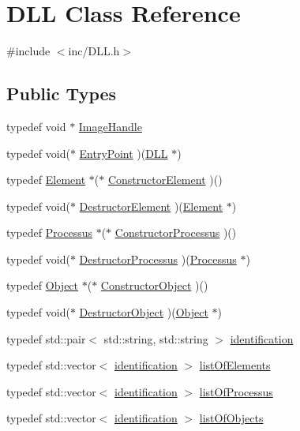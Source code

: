 \hypertarget{classDLL}{
\section{DLL Class Reference}
\label{classDLL}
}


{\ttfamily \#include $<$inc/DLL.h$>$}\subsection*{Public Types}
\begin{DoxyCompactItemize}
\item 
typedef void $\ast$ \hyperlink{classDLL_addaefe5c907a5f357cc18718300f22b0}{ImageHandle}
\item 
typedef void($\ast$ \hyperlink{classDLL_a9b8086a1063fe93f3545a3d20c5ca192}{EntryPoint} )(\hyperlink{classDLL}{DLL} $\ast$)
\item 
typedef \hyperlink{classElement}{Element} $\ast$($\ast$ \hyperlink{classDLL_a7b46644880e5b843144baed79bb2f961}{ConstructorElement} )()
\item 
typedef void($\ast$ \hyperlink{classDLL_a6e838cc12677c8ea48d5312984f8f18b}{DestructorElement} )(\hyperlink{classElement}{Element} $\ast$)
\item 
typedef \hyperlink{classProcessus}{Processus} $\ast$($\ast$ \hyperlink{classDLL_ad47776a706e85c9bdae28ec91e88b8e8}{ConstructorProcessus} )()
\item 
typedef void($\ast$ \hyperlink{classDLL_a3bd20fb58c02a1a2f4e96d59da21faf5}{DestructorProcessus} )(\hyperlink{classProcessus}{Processus} $\ast$)
\item 
typedef \hyperlink{classObject}{Object} $\ast$($\ast$ \hyperlink{classDLL_a19c89e48f530542f639456f569ede17a}{ConstructorObject} )()
\item 
typedef void($\ast$ \hyperlink{classDLL_a143a49a77c9a75b043e9dba700afc45b}{DestructorObject} )(\hyperlink{classObject}{Object} $\ast$)
\item 
typedef std::pair$<$ std::string, std::string $>$ \hyperlink{classDLL_aa2df9e9226052bfa93a6df56f1ca689b}{identification}
\item 
typedef std::vector$<$ \hyperlink{classDLL_aa2df9e9226052bfa93a6df56f1ca689b}{identification} $>$ \hyperlink{classDLL_a36792635c3cd36adbaaef2ff7152046e}{listOfElements}
\item 
typedef std::vector$<$ \hyperlink{classDLL_aa2df9e9226052bfa93a6df56f1ca689b}{identification} $>$ \hyperlink{classDLL_aded1b0bb41b288ed4f34cb6d6632d486}{listOfProcessus}
\item 
typedef std::vector$<$ \hyperlink{classDLL_aa2df9e9226052bfa93a6df56f1ca689b}{identification} $>$ \hyperlink{classDLL_a68629aa6f9103c5a3082511ff8218b1e}{listOfObjects}
\end{DoxyCompactItemize}
